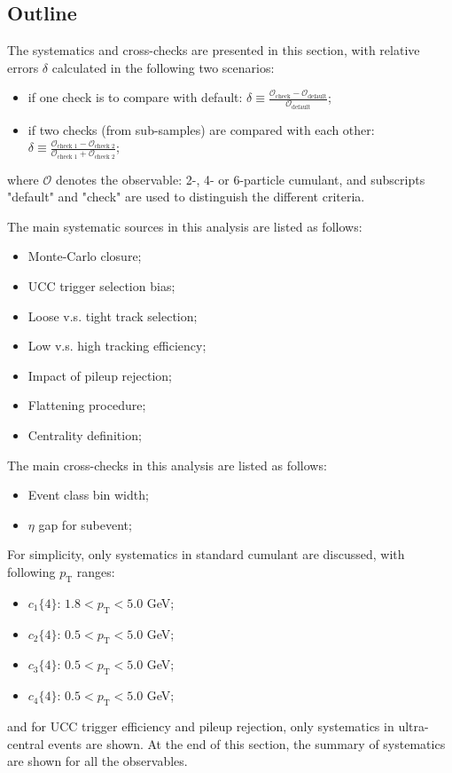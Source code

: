 \subsection{Outline}
The systematics and cross-checks are presented in this section, with relative errors $\delta$ calculated in the following two scenarios:
\begin{itemize}
\item if one check is to compare with default: $\delta\equiv\frac{\mathcal{O}_\text{check}-\mathcal{O}_\text{default}}{\mathcal{O}_\text{default}}$;
\item if two checks (from sub-samples) are compared with each other: $\delta\equiv\frac{\mathcal{O}_\text{check 1}-\mathcal{O}_\text{check 2}}{\mathcal{O}_\text{check 1}+\mathcal{O}_\text{check 2}}$;
\end{itemize}
where $\mathcal{O}$ denotes the observable: 2-, 4- or 6-particle cumulant, and subscripts "default" and "check" are used to distinguish the different criteria.

The main systematic sources in this analysis are listed as follows:
\begin{itemize}
\item Monte-Carlo closure;
\item UCC trigger selection bias;
\item Loose v.s. tight track selection;
\item Low v.s. high tracking efficiency;
\item Impact of pileup rejection;
\item Flattening procedure;
\item Centrality definition;
\end{itemize}

The main cross-checks in this analysis are listed as follows:
\begin{itemize}
\item Event class bin width;
\item $\eta$ gap for subevent;
\end{itemize}

For simplicity, only systematics in standard cumulant are discussed, with following $p_{\text{T}}$ ranges:
\begin{itemize}
\item $c_1\{4\}$: $1.8<p_{\text{T}}<5.0$ GeV;
\item $c_2\{4\}$: $0.5<p_{\text{T}}<5.0$ GeV;
\item $c_3\{4\}$: $0.5<p_{\text{T}}<5.0$ GeV;
\item $c_4\{4\}$: $0.5<p_{\text{T}}<5.0$ GeV;
\end{itemize}
and for UCC trigger efficiency and pileup rejection, only systematics in ultra-central events are shown. At the end of this section, the summary of systematics are shown for all the observables.



